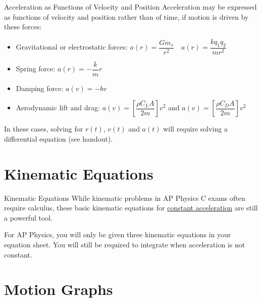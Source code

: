 \documentclass[12pt,compress,aspectratio=169,dvipsnames]{beamer}
\begin{document}
\begin{frame}{Acceleration as Functions of Velocity and Position}
  Acceleration may be expressed as functions of velocity and position rather
  than of time, if motion is driven by these forces:
  \begin{itemize}
  \item Gravitational or electrostatic forces:
    $a(r)=\dfrac{Gm_s}{r^2}\quad a(r)=\dfrac{kq_1q_2}{mr^2}$
  \item Spring force: $a(r)=-\dfrac kmr$
  \item Damping force: $a(v)=-bv$
  \item Aerodynamic lift and drag:
    $a(v)=\left[\dfrac{\rho C_L A}{2m}\right] v^2$ and
    $a(v)=\left[\dfrac{\rho C_D A}{2m}\right]v^2$
  \end{itemize}

  \vspace{.1in}In these cases, solving for $r(t)$, $v(t)$ and $a(t)$ will
  require solving a differential equation (see handout).
\end{frame}



\section{Kinematic Equations}

\begin{frame}{Kinematic Equations}
  While kinematic problems in AP Physics C exams often require calculus, these
  basic kinematic equations for \underline{constant acceleration} are still a
  powerful tool.

  \vspace{-.2in}{\large
    \begin{align*}
      x &= x_0+ v_0t + \frac12at^2\\
      v &= v_0+at\\
      v^2 &= v_0^2+ 2a(x-x_0)
    \end{align*}
  }

  For AP Physics, you will only be given three kinematic equations in your
  equation sheet. You will still be required to integrate when acceleration is
  not constant.
\end{frame}



\section{Motion Graphs}
\end{document}
